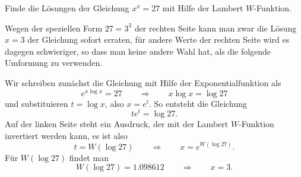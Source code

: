Finde die Lösungen der Gleichung $x^x=27$ mit Hilfe der Lambert $W$-Funktion.

\begin{loesung}
Wegen der speziellen Form $27=3^3$ der rechten Seite kann man
zwar die Lösung $x=3$ der Gleichung sofort erraten, für andere 
Werte der rechten Seite wird es dagegen schwieriger, so dass man
keine andere Wahl hat, als die folgende Umformung zu verwenden.

Wir schreiben zunächst die Gleichung mit Hilfe der Exponentialfunktion als
\[
e^{x\log x} = 27
\qquad\Rightarrow\qquad
x\log x = \log 27
\]
und substituieren $t=\log x$, also $x=e^t$. 
So entsteht die Gleichung
\[
te^t = \log 27.
\]
Auf der linken Seite steht ein Ausdruck, der mit der Lambert $W$-Funktion
invertiert werden kann, es ist also
\[
t = W(\log 27)
\qquad\Rightarrow\qquad
x=e^{W(\log 27)}.
\]
Für $W(\log 27)$ findet man
\[
W(\log 27) = 1.098612
\qquad\Rightarrow\qquad
x=3.
\]
\end{loesung}
